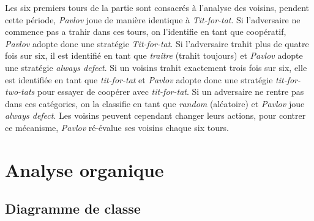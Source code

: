 \documentclass[a4paper, french]{article}
\begin{document}
Les six premiers tours de la partie sont consacrés à l'analyse des voisins, pendent cette période, \textit{Pavlov} joue de manière identique à \textit{Tit-for-tat}. Si l'adversaire ne commence pas a trahir dans ces tours, on l'identifie en tant que coopératif, \textit{Pavlov} adopte donc une stratégie \textit{Tit-for-tat}. Si l'adversaire trahit plus de quatre fois sur six, il est identifié en tant que \textit{traitre} (trahit toujours) et \textit{Pavlov} adopte une stratégie \textit{always defect}. Si un voisins trahit exactement trois fois sur six, elle est identifiée en tant que \textit{tit-for-tat} et \textit{Pavlov} adopte donc une stratégie \textit{tit-for-two-tats} pour essayer de coopérer avec \textit{tit-for-tat}. Si un adversaire ne rentre pas dans ces catégories, on la classifie en tant que \textit{random} (aléatoire) et \textit{Pavlov} joue \textit{always defect}. Les voisins peuvent cependant changer leurs actions, pour contrer ce mécanisme, \textit{Pavlov} ré-évalue ses voisins chaque six tours.

\pagebreak
\section{Analyse organique}
\subsection{Diagramme de classe}
\end{document}
